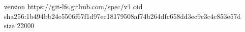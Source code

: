 version https://git-lfs.github.com/spec/v1
oid sha256:1b494bb24e5506f67f1d97ec18179508af74b264dfc658dd3ec9c3c4c853e57d
size 22000
